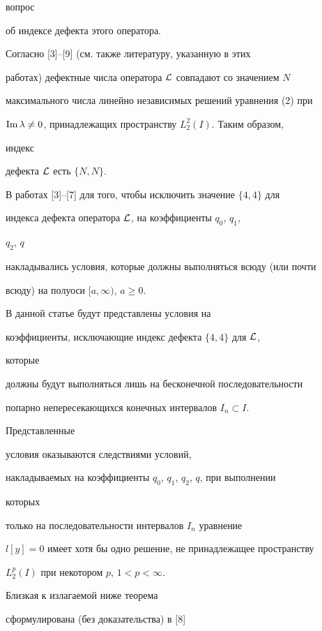 вопрос 


об индексе дефекта этого оператора. 


 


Согласно [3]--[9] (см. также литературу, указанную в этих 


работах) дефектные числа оператора $\cal L$ совпадают со значением $N$ 


максимального числа линейно независимых решений уравнения (2) при 


$\operatorname{Im}\lambda\ne0$, принадлежащих пространству $L^2_2(I)$. Таким образом, 


индекс 


дефекта $\cal L$ есть $\{N,N\}$. 


 


В работах [3]--[7] для того, чтобы исключить значение $\{4,4\}$ для 


индекса дефекта оператора $\cal L$, на коэффициенты $q_0$, $q_1$, 


$q_2$, $q$ 


накладывались условия, которые должны выполняться всюду (или почти 


всюду) на полуоси $[a,\infty)$, $a\ge0$. 


 


В данной статье будут представлены условия на 


коэффициенты, исключающие индекс дефекта $\{4,4\}$ для $\cal L$, 


которые 


должны будут выполняться лишь на бесконечной последовательности 


попарно непересекающихся конечных интервалов $I_n\subset I$. 


Представленные 


условия оказываются следствиями условий, 


накладываемых на коэффициенты $q_0$, $q_1$, $q_2$, $q$, при выполнении 


которых 


только на последовательности интервалов $I_n$ уравнение 


$l[y]=0$ имеет хотя бы одно решение, не принадлежащее пространству 


$L^p_2(I)$ при некотором $p$, $1<p<\infty$. 


Близкая к излагаемой ниже теорема 


сформулирована (без доказательства) в [8] 



